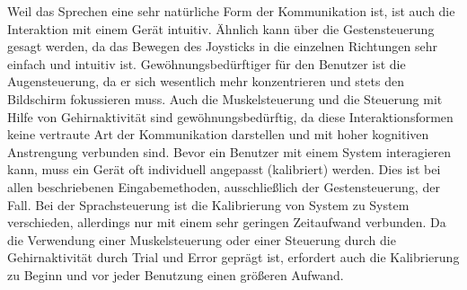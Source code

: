 \newline \newline
Weil das Sprechen eine sehr natürliche Form der Kommunikation ist, ist auch die Interaktion mit einem Gerät intuitiv. Ähnlich kann über die Gestensteuerung gesagt werden, da das Bewegen des Joysticks in die einzelnen Richtungen sehr einfach und intuitiv ist. Gewöhnungsbedürftiger für den Benutzer ist die Augensteuerung, da er sich wesentlich mehr konzentrieren und stets den Bildschirm fokussieren muss. Auch die Muskelsteuerung und die Steuerung mit Hilfe von Gehirnaktivität sind gewöhnungsbedürftig, da diese Interaktionsformen keine vertraute Art der Kommunikation darstellen und mit hoher kognitiven Anstrengung verbunden sind.
\newline \newline
Bevor ein Benutzer mit einem System interagieren kann, muss ein Gerät oft individuell angepasst (kalibriert) werden. Dies ist bei allen beschriebenen Eingabemethoden, ausschließlich der Gestensteuerung, der Fall. Bei der Sprachsteuerung ist die Kalibrierung von System zu System verschieden, allerdings nur mit einem sehr geringen Zeitaufwand verbunden. Da die Verwendung einer Muskelsteuerung oder einer Steuerung durch die Gehirnaktivität durch Trial und Error geprägt ist, erfordert auch die Kalibrierung zu Beginn und vor jeder Benutzung einen größeren Aufwand.
\newpage
%
